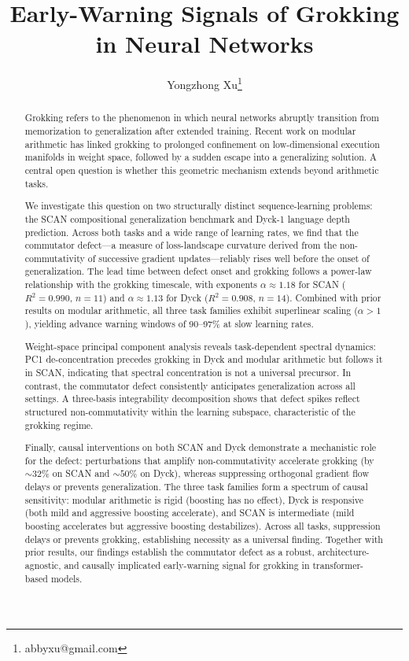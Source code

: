 \documentclass[11pt]{article}
\title{Early-Warning Signals of Grokking in Neural Networks}
\author{Yongzhong Xu\thanks{abbyxu@gmail.com}}
\date{}
\begin{document}
\maketitle

\begin{abstract}
Grokking refers to the phenomenon in which neural networks abruptly transition from memorization to generalization after extended training. Recent work on modular arithmetic has linked grokking to prolonged confinement on low-dimensional execution manifolds in weight space, followed by a sudden escape into a generalizing solution. A central open question is whether this geometric mechanism extends beyond arithmetic tasks.

We investigate this question on two structurally distinct sequence-learning problems: the SCAN compositional generalization benchmark and Dyck-1 language depth prediction. Across both tasks and a wide range of learning rates, we find that the commutator defect---a measure of loss-landscape curvature derived from the non-commutativity of successive gradient updates---reliably rises well before the onset of generalization. The lead time between defect onset and grokking follows a power-law relationship with the grokking timescale, with exponents $\alpha \approx 1.18$ for SCAN ($R^2 = 0.990$, $n = 11$) and $\alpha \approx 1.13$ for Dyck ($R^2 = 0.908$, $n = 14$). Combined with prior results on modular arithmetic, all three task families exhibit superlinear scaling ($\alpha > 1$), yielding advance warning windows of 90--97\% at slow learning rates.

Weight-space principal component analysis reveals task-dependent spectral dynamics: PC1 de-concentration precedes grokking in Dyck and modular arithmetic but follows it in SCAN, indicating that spectral concentration is not a universal precursor. In contrast, the commutator defect consistently anticipates generalization across all settings. A three-basis integrability decomposition shows that defect spikes reflect structured non-commutativity within the learning subspace, characteristic of the grokking regime.

Finally, causal interventions on both SCAN and Dyck demonstrate a mechanistic role for the defect: perturbations that amplify non-commutativity accelerate grokking (by ${\sim}32\%$ on SCAN and ${\sim}50\%$ on Dyck), whereas suppressing orthogonal gradient flow delays or prevents generalization. The three task families form a spectrum of causal sensitivity: modular arithmetic is rigid (boosting has no effect), Dyck is responsive (both mild and aggressive boosting accelerate), and SCAN is intermediate (mild boosting accelerates but aggressive boosting destabilizes). Across all tasks, suppression delays or prevents grokking, establishing necessity as a universal finding. Together with prior results, our findings establish the commutator defect as a robust, architecture-agnostic, and causally implicated early-warning signal for grokking in transformer-based models.
\end{abstract}
\end{document}
